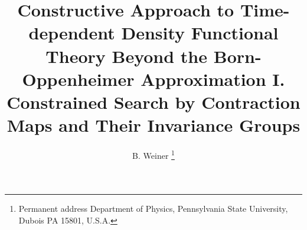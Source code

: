 %






\epsfverbosetrue 
\newcommand{\be}{\begin{equation}}
\newcommand{\ee}{\end{equation}}
\newcommand{\bea}{\begin{eqnarray}}
\newcommand{\eea}{\end{eqnarray}}
\newcommand{\ba}{\begin{array}}
\newcommand{\ea}{\end{array}}
\newcommand{\half}{1/2}
\newcommand{\pprime}{\prime \prime}
\newcommand{\ppprime}{\prime \prime \prime}
\def\rank{\mathop{\rm rank}\nolimits}



\title{Constructive Approach to Time-dependent Density Functional Theory
Beyond the Born-Oppenheimer Approximation I. Constrained Search by
Contraction Maps and Their Invariance Groups}
\author{B. Weiner \thanks{%
Permanent address Department of Physics, Pennsylvania State University,
Dubois PA 15801, U.S.A.}}
\address{and \\
S.B. Trickey \\
Quantum Theory Project \\
Department of Physics \\
University of Florida \\
Gainesville, FL 32611-8435, U.S.A.\\
July 25, 2001}
\maketitle


